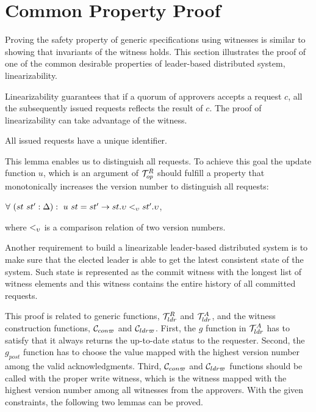 \section{Common Property Proof}
\label{chapter:witnesspassing:sec:prove-safety-with-witness}

Proving the safety property of generic specifications using witnesses is 
similar to showing that invariants of the witness holds.
This section illustrates the proof of one of the common desirable properties
of leader-based distributed system, linearizability.

Linearizability guarantees that if a quorum of approvers accepts a request $c$, 
all the subsequently issued requests reflects the result of $c$. 
The proof of linearizability can take advantage of the witness. 

\begin{lemma}
All issued requests have a unique identifier.
\end{lemma}

This lemma enables us to distinguish all requests. To achieve this goal the 
update function $u$, which is an argument of $\mathcal{T}^{R}_{op}$ should fulfill a 
property that monotonically increases the version number to distinguish all
requests:
\begin{center}
$\forall \ (st \ st' : \Delta) : \ u \ st = st' \rightarrow st.\upsilon
<_{\upsilon} st'.\upsilon$,
\end{center}
where $<_{\upsilon}$ is a comparison relation of two version numbers.

Another requirement to build a linearizable leader-based distributed system 
is to make sure that the elected leader is able to get the latest consistent
state of the system. Such state is represented as the commit witness with the
longest list of witness elements and this witness contains the entire history of
all committed requests. 

This proof is related to generic functions, $\mathcal{T}^{R}_{ldr}$ and $\mathcal{T}^{A}_{ldr}$, 
and the witness construction functions, $\mathcal{C}_{con\varpi}$ and $\mathcal{C}_{ldr\varpi}$.
First, the $g$ function in $\mathcal{T}^{A}_{ldr}$ has to satisfy that  
it always returns the up-to-date status to the requester.
Second, the $g_{post}$ function has to choose the value mapped with the highest 
version number among the valid acknowledgments. 
Third, $\mathcal{C}_{con\varpi}$ and $\mathcal{C}_{ldr\varpi}$ functions should be called with the proper 
write witness, which is the witness mapped with the highest version number 
among all witnesses from the approvers. 
With the given constraints, the following two lemmas can be proved.

